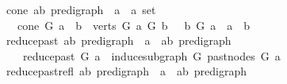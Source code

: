 \begin{isabellebody}
\isanewline
{}\isamarkupfalse%
\ cone{\isacharcolon}{\kern0pt}{\isacharcolon}{\kern0pt}\ {\isachardoublequoteopen}{\isacharparenleft}{\kern0pt}{\isacharprime}{\kern0pt}a{\isacharcomma}{\kern0pt}{\isacharprime}{\kern0pt}b{\isacharparenright}{\kern0pt}\ pre{\isacharunderscore}{\kern0pt}digraph\ {\isasymRightarrow}\ {\isacharprime}{\kern0pt}a\ {\isasymRightarrow}\ {\isacharprime}{\kern0pt}a\ set{\isachardoublequoteclose}\isanewline
\ \ \ {\isachardoublequoteopen}cone\ G\ a\ {\isacharequal}{\kern0pt}\ {\isacharbraceleft}{\kern0pt}b\ {\isasymin}\ verts\ G{\isachardot}{\kern0pt}\ {\isacharparenleft}{\kern0pt}a\ {\isasymrightarrow}\isactrlsup {\isacharplus}{\kern0pt}\isactrlbsub G\isactrlesub \ b\ {\isasymor}\ \ b\ {\isasymrightarrow}\isactrlsup {\isacharplus}{\kern0pt}\isactrlbsub G\isactrlesub \ a\ {\isasymor}\ a\ {\isacharequal}{\kern0pt}\ b{\isacharparenright}{\kern0pt}{\isacharbraceright}{\kern0pt}{\isachardoublequoteclose}\isanewline
\isanewline
{}\isamarkupfalse%
\ reduce{\isacharunderscore}{\kern0pt}past{\isacharcolon}{\kern0pt}{\isacharcolon}{\kern0pt}\ {\isachardoublequoteopen}{\isacharparenleft}{\kern0pt}{\isacharprime}{\kern0pt}a{\isacharcomma}{\kern0pt}{\isacharprime}{\kern0pt}b{\isacharparenright}{\kern0pt}\ pre{\isacharunderscore}{\kern0pt}digraph\ {\isasymRightarrow}\ {\isacharprime}{\kern0pt}a\ {\isasymRightarrow}\ {\isacharparenleft}{\kern0pt}{\isacharprime}{\kern0pt}a{\isacharcomma}{\kern0pt}{\isacharprime}{\kern0pt}b{\isacharparenright}{\kern0pt}\ pre{\isacharunderscore}{\kern0pt}digraph{\isachardoublequoteclose}\isanewline
\ \ \ \isanewline
\ \ \ \ {\isachardoublequoteopen}reduce{\isacharunderscore}{\kern0pt}past\ G\ a\ {\isacharequal}{\kern0pt}\ induce{\isacharunderscore}{\kern0pt}subgraph\ G\ {\isacharparenleft}{\kern0pt}past{\isacharunderscore}{\kern0pt}nodes\ G\ a{\isacharparenright}{\kern0pt}{\isachardoublequoteclose}\isanewline
\isanewline
{}\isamarkupfalse%
\ reduce{\isacharunderscore}{\kern0pt}past{\isacharunderscore}{\kern0pt}refl{\isacharcolon}{\kern0pt}{\isacharcolon}{\kern0pt}\ {\isachardoublequoteopen}{\isacharparenleft}{\kern0pt}{\isacharprime}{\kern0pt}a{\isacharcomma}{\kern0pt}{\isacharprime}{\kern0pt}b{\isacharparenright}{\kern0pt}\ pre{\isacharunderscore}{\kern0pt}digraph\ {\isasymRightarrow}\ {\isacharprime}{\kern0pt}a\ {\isasymRightarrow}\ {\isacharparenleft}{\kern0pt}{\isacharprime}{\kern0pt}a{\isacharcomma}{\kern0pt}{\isacharprime}{\kern0pt}b{\isacharparenright}{\kern0pt}\ pre{\isacharunderscore}{\kern0pt}digraph{\isachardoublequoteclose}\isanewline

\end{isabellebody}
